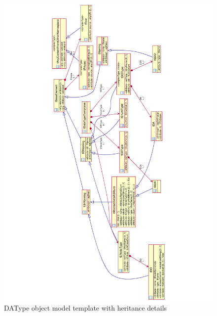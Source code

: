\begin{landscape}
	\begin{figure}
	  \includegraphics[angle=-90, width=1.0\linewidth]{chapters/ch-scl/figures/SCL-uml-DATypeTemplate-Deept2}
	  \caption{DAType object model template with heritance details}  
	  \label{fig:pdf-SCL-uml-DATypeTemplate-Deept2}
	\end{figure}
\end{landscape}

